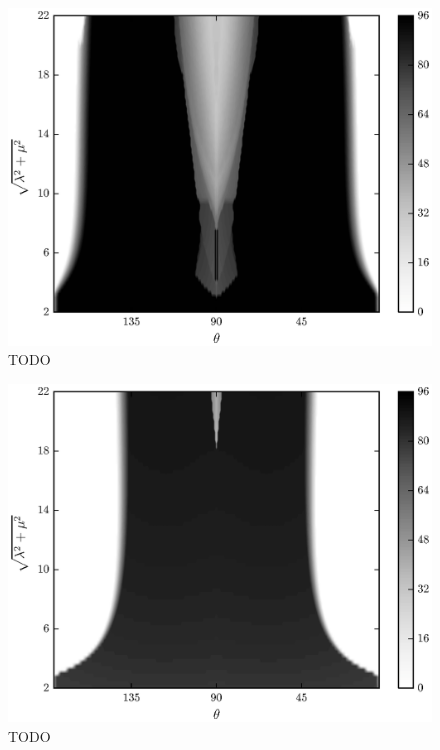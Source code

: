 	\begin{figure}[t]
		\begin{center}
			\includegraphics{./fig/ch3/push/b100/grid.eps}
		\end{center}		
		\caption{ TODO
		\label{fig:PushGrid:b100}}
	\end{figure}	
	
	\begin{figure}[t]
		\begin{center}
			\includegraphics{./fig/ch3/push/b1000/grid.eps}
		\end{center}		
		\caption{ TODO
		\label{fig:PushGrid:b1000}}
	\end{figure}
	
